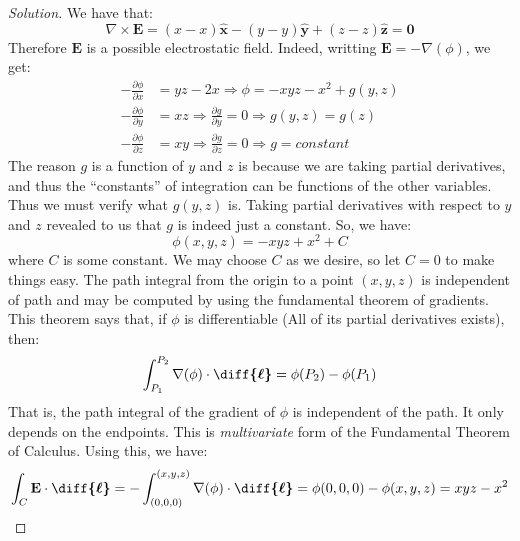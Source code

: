 \documentclass[crop=false,class=article,oneside]{standalone}
\begin{document}
    \begin{proof}[Solution]
        We have that:
        \begin{equation*}
            \nabla\times\mathbf{E}
            =(x-x)\hat{\mathbf{x}}
            -(y-y)\hat{\mathbf{y}}
            +(z-z)\hat{\mathbf{z}}
            =\mathbf{0}    
        \end{equation*}
        Therefore $\mathbf{E}$ is a possible electrostatic field.
        Indeed, writting $\mathbf{E}=-\nabla(\phi)$, we get:
        \begin{align*}
            -\frac{\partial\phi}{\partial{x}}
            &=yz-2x
            \Rightarrow\phi=-xyz-x^{2}+g(y,z)\\
            -\frac{\partial\phi}{\partial{y}}
            &=xz
            \Rightarrow\frac{\partial{g}}{\partial{y}}=0
            \Rightarrow{g(y,z)=g(z)}\\
            -\frac{\partial\phi}{\partial{z}}
            &=xy
            \Rightarrow\frac{\partial{g}}{\partial{z}}=0
            \Rightarrow{g=constant}
        \end{align*}
        The reason $g$ is a function of $y$ and $z$ is because
        we are taking partial derivatives, and thus the
        ``constants'' of integration can be functions of
        the other variables. Thus we must verify what $g(y,z)$
        is. Taking partial derivatives with respect to
        $y$ and $z$ revealed to us that $g$ is indeed just
        a constant. So, we have:
        \begin{equation*}
            \phi(x,y,z)=-xyz+x^{2}+C    
        \end{equation*}
        where $C$ is some constant. We may choose $C$ as we desire,
        so let $C=0$ to make things easy. The path integral
        from the origin to a point $(x,y,z)$ is independent
        of path and may be computed by using the fundamental
        theorem of gradients. This theorem says that,
        if $\phi$ is differentiable
        (All of its partial derivatives exists), then:
        \begin{equation*}
            \int_{P_{1}}^{P_{2}}
            \nabla(\phi)\cdot\boldsymbol{\diff{\ell}}
            =\phi(P_{2})-\phi(P_{1})
        \end{equation*}
        That is, the path integral of the gradient of
        $\phi$ is independent of the path. It only depends
        on the endpoints.
        This is \textit{multivariate} form of the
        Fundamental Theorem of Calculus. Using this, we have:
        \begin{align*}
            \int_{C}\mathbf{E}\cdot\boldsymbol{\diff{\ell}}
            =-\int _{(0,0,0)}^{(x,y,z)}
            \nabla(\phi)\cdot\boldsymbol{\diff{\ell}}
            =\phi(0,0,0)-\phi(x,y,z)
            =xyz-x^2
        \end{align*}
    \end{proof}
\end{document}
